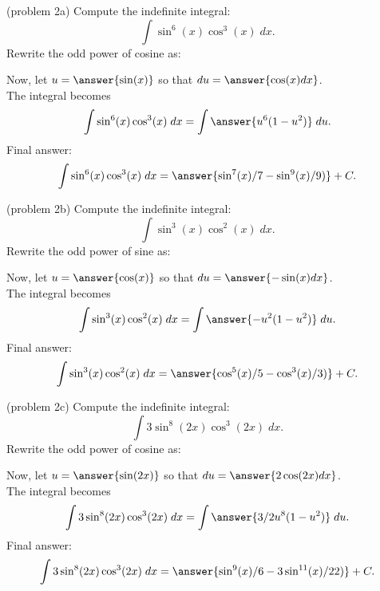 \documentclass{ximera}
\begin{document}
\begin{problem}(problem 2a)
Compute the indefinite integral:
\[
\int \sin^6(x)\cos^3(x) \; dx.
\]
Rewrite the odd power of cosine as:
\begin{multipleChoice}
\end{multipleChoice}

Now, let $u = \answer{\sin(x)}$ so that $du = \answer{\cos(x) dx}$.\\
The integral becomes
\[
\int \sin^6(x)\cos^3(x) \; dx= \int \answer{u^6(1-u^2)} \; du.
\]
Final answer:
\[
\int \sin^6(x)\cos^3(x) \; dx= \answer{\sin^7(x)/7 - \sin^9(x)/9)} + C.
\]
\end{problem}


\begin{problem}(problem 2b)
Compute the indefinite integral:
\[
\int \sin^3(x)\cos^2(x) \; dx.
\]
Rewrite the odd power of sine as:
\begin{multipleChoice}

\end{multipleChoice}

Now, let $u = \answer{\cos(x)}$ so that $du = \answer{-\sin(x) dx}$.\\
The integral becomes
\[
\int \sin^3(x)\cos^2(x) \; dx= \int \answer{-u^2(1-u^2)} \; du.
\]
Final answer:
\[
\int \sin^3(x)\cos^2(x) \; dx= \answer{\cos^5(x)/5 - \cos^3(x)/3)} + C.
\]
\end{problem}



\begin{problem}(problem 2c)
Compute the indefinite integral:
\[
\int 3\sin^8(2x)\cos^3(2x) \; dx.
\]
Rewrite the odd power of cosine as:
\begin{multipleChoice}

\end{multipleChoice}

Now, let $u = \answer{\sin(2x)}$ so that $du = \answer{2\cos(2x) dx}$.\\
The integral becomes
\[
\int 3\sin^8(2x)\cos^3(2x) \; dx= \int \answer{3/2 u^8(1-u^2)} \; du.
\]
Final answer:
\[
\int 3\sin^8(2x)\cos^3(2x) \; dx= \answer{\sin^9(x)/6 - 3 \sin^{11}(x)/22)} + C.
\]
\end{problem}
\end{document}
